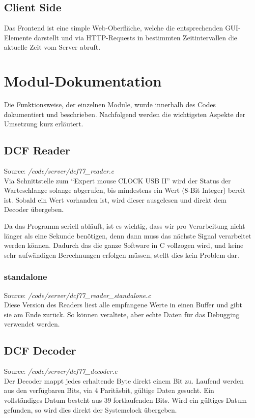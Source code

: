 \subsection{Client Side}
Das Frontend ist eine simple Web-Oberfläche, welche die entsprechenden GUI-Elemente darstellt und via HTTP-Requests in bestimmten Zeitintervallen die aktuelle Zeit vom Server abruft.

\section{Modul-Dokumentation}
Die Funktionsweise, der einzelnen Module, wurde innerhalb des Codes dokumentiert und beschrieben. Nachfolgend werden die wichtigsten Aspekte der Umsetzung kurz erläutert.

\subsection{DCF Reader}
Source: \textit{/code/server/dcf77\_reader.c}\\
Via Schnittstelle zum "`Expert mouse CLOCK USB II"' wird der Status der Warteschlange  solange abgerufen, bis mindestens ein Wert (8-Bit Integer) bereit ist.
Sobald ein Wert vorhanden ist, wird dieser ausgelesen und direkt dem Decoder übergeben.

Da das Programm seriell abläuft, ist es wichtig, dass wir pro Verarbeitung nicht länger als eine Sekunde benötigen, denn dann muss das nächste Signal verarbeitet werden können.
Dadurch das die ganze Software in C vollzogen wird, und keine sehr aufwändigen Berechnungen erfolgen müssen, stellt dies kein Problem dar.

\subsubsection{standalone}
Source: \textit{/code/server/dcf77\_reader\_standalone.c}\\
Diese Version des Readers liest alle empfangene Werte in einen Buffer und gibt sie am Ende zurück. So können veraltete, aber echte Daten für das Debugging verwendet werden.

\subsection{DCF Decoder}
Source: \textit{/code/server/dcf77\_decoder.c}\\
Der Decoder mappt jedes erhaltende Byte direkt einem Bit zu. Laufend werden aus den verfügbaren Bits, via 4 Paritäsbit, gültige Daten gesucht. Ein vollständiges Datum besteht aus 39 fortlaufenden Bits.
Wird ein gültiges Datum gefunden, so wird dies direkt der Systemclock übergeben.

